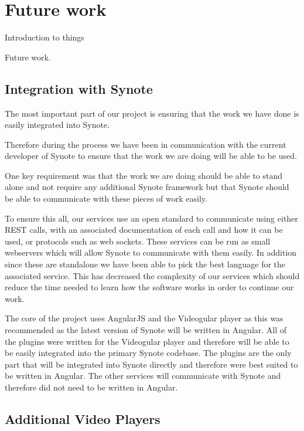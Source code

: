 \chapter{Future work} \label{Chapter: Future Work}

Introduction to things

Future work.

\section{Integration with Synote}

The most important part of our project is ensuring that the work we have done is easily integrated into Synote.

Therefore during the process we have been in communication with the current developer of Synote to ensure that the work we are doing will be able to be used.

One key requirement  was that the work we are doing should be able to stand alone and not require any additional Synote framework but that Synote should be able to communicate with these pieces of work easily.

To ensure this all, our services use an open standard to communicate using either \gls{REST} calls, with an associated documentation of each call and how it can be used, or protocols such as web sockets. These services can be run as small webservers which will allow Synote to communicate with them easily. In addition since these are standalone we have been able to pick the best language for the associated service. This has decreased the complexity of our services which should reduce the time needed to learn how the software works in order to continue our work.

The core of the project uses \gls{AngularJS} and the \gls{Videogular} player as this was recommended as the latest version of Synote will be written in Angular. All of the plugins were written for the \gls{Videogular} player and therefore will be able to be easily integrated into the primary Synote codebase. The plugins are the only part that will be integrated into Synote directly and therefore were best suited to be written in Angular. The other services will communicate with Synote and therefore did not need to be written in Angular.

\section{Additional Video Players}

